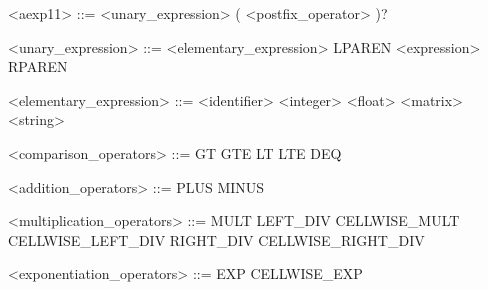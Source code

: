 \documentclass{article}
\begin{document}
\begin{grammar}
	<aexp11> ::= <unary_expression> ( <postfix_operator> )?
	
	<unary_expression> ::= <elementary_expression> \alt LPAREN <expression> RPAREN
	
	<elementary_expression> ::= <identifier> \alt <integer> \alt <float> \alt <matrix> \alt <string>
	
	<comparison_operators> ::= GT \alt GTE \alt LT \alt LTE \alt DEQ
	
	<addition_operators> ::= PLUS \alt MINUS
	
	<multiplication_operators> ::= MULT \alt LEFT_DIV \alt CELLWISE_MULT \alt CELLWISE_LEFT_DIV \alt RIGHT_DIV \alt CELLWISE_RIGHT_DIV
	
	<exponentiation_operators> ::= EXP \alt CELLWISE_EXP
\end{grammar}
\end{document}
